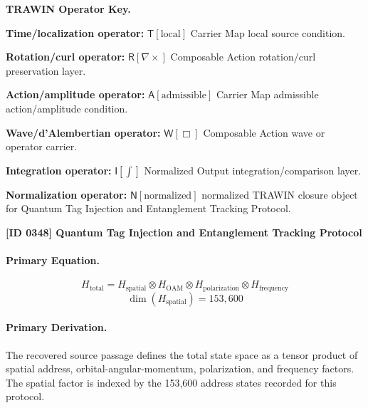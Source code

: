 \par\vspace{0.45\baselineskip}
\noindent\begin{minipage}[t]{\linewidth}
\begingroup
\small
\raggedright
\textbf{TRAWIN Operator Key.}\par
\noindent\textbf{Time/localization operator:} $\mathsf{T}\!\left[\mathrm{local}\right]$ Carrier Map local source condition.\par
\noindent\textbf{Rotation/curl operator:} $\mathsf{R}\!\left[\nabla\times\right]$ Composable Action rotation/curl preservation layer.\par
\noindent\textbf{Action/amplitude operator:} $\mathsf{A}\!\left[\mathrm{admissible}\right]$ Carrier Map admissible action/amplitude condition.\par
\noindent\textbf{Wave/d'Alembertian operator:} $\mathsf{W}\!\left[\Box\right]$ Composable Action wave or operator carrier.\par
\noindent\textbf{Integration operator:} $\mathsf{I}\!\left[\int\right]$ Normalized Output integration/comparison layer.\par
\noindent\textbf{Normalization operator:} $\mathsf{N}\!\left[\mathrm{normalized}\right]$ normalized TRAWIN closure object for Quantum Tag Injection and Entanglement Tracking Protocol.\par
\endgroup
\end{minipage}

\clearpage
\noindent\textbf{[ID 0348] Quantum Tag Injection and Entanglement Tracking Protocol}\par
\vspace{0.35em}
\paragraph{Primary Equation.}
\[
H_{\mathrm{total}} = H_{\mathrm{spatial}} \otimes H_{\mathrm{OAM}} \otimes H_{\mathrm{polarization}} \otimes H_{\mathrm{frequency}}
\]
\[
\dim(H_{\mathrm{spatial}})=153{,}600
\]

\paragraph{Primary Derivation.}
The recovered source passage defines the total state space as a tensor product of spatial address, orbital-angular-momentum, polarization, and frequency factors. The spatial factor is indexed by the 153,600 address states recorded for this protocol.

